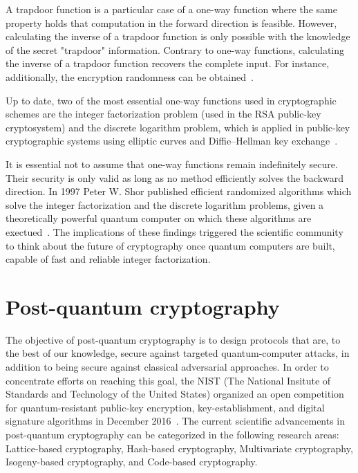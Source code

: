 \documentclass[11pt,
  oneside,openany,    %
]{scrreprt}
\begin{document}
A trapdoor function is a particular case of a one-way function where the same property holds that computation in the forward direction is feasible. However, calculating the inverse of a trapdoor function is only possible with the knowledge of the secret "trapdoor" information. Contrary to one-way functions, calculating the inverse of a trapdoor function recovers the complete input. For instance, additionally, the encryption randomness can be obtained~\cite{trapdoor}.

Up to date, two of the most essential one-way functions used in cryptographic schemes are the integer factorization problem (used in the RSA public-key cryptosystem) and the discrete logarithm problem, which is applied in public-key cryptographic systems using elliptic curves and Diffie–Hellman key exchange~\cite{Kryptografie2016}.

It is essential not to assume that one-way functions remain indefinitely secure. Their security is only valid as long as no method efficiently solves the backward direction. In 1997 Peter W. Shor published efficient randomized algorithms which solve the integer factorization and the discrete logarithm problems, given a theoretically powerful quantum computer on which these algorithms are exectued~\cite{pshor1997}. The implications of these findings triggered the scientific community to think about the future of cryptography once quantum computers are built, capable of fast and reliable integer factorization. 

\section{Post-quantum cryptography}

The objective of post-quantum cryptography is to design protocols that are, to the best of our knowledge, secure against targeted quantum-computer attacks, in addition to being secure against classical adversarial approaches. In order to concentrate efforts on reaching this goal, the NIST (The National Insitute of Standards and Technology of the United States) organized an open competition for quantum-resistant public-key encryption, key-establishment, and digital signature algorithms in December 2016~\cite{nistPQCcompetitionAnnounce}. 
The current scientific advancements in post-quantum cryptography can be categorized in the following research areas: Lattice-based cryptography, Hash-based cryptography, Multivariate cryptography, Isogeny-based cryptography, and Code-based cryptography.
\end{document}
